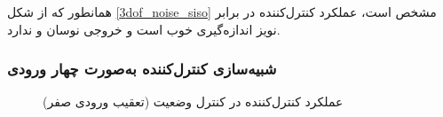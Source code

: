 همانطور که از شکل
\ref{3dof_noise_siso}
مشخص است، عملکرد کنترل‌کننده  در برابر نویز اندازه‌گیری خوب است و خروجی نوسان و ندارد.
\subsubsection{شبیه‌سازی کنترل‌کننده به‌صورت چهار ورودی}


\begin{figure}[H]
	\centering
	\caption{‫‪عملکرد کنترل‌کننده  در کنترل وضعیت (تعقیب ورودی صفر)}
	\label{lqidg_roll_pitch_yaw_fig_simulation_MIMO_noise}
\end{figure}


